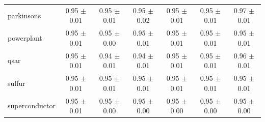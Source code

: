 \begin{table}[!htbp]
{\begin{tabular}{lcccccc}
parkinsons & 0.95 $\pm$ 0.01 & 0.95 $\pm$ 0.01 & 0.95 $\pm$ 0.02 & 0.95 $\pm$ 0.01 & 0.95 $\pm$ 0.01 & 0.97 $\pm$ 0.01 \\
powerplant & 0.95 $\pm$ 0.01 & 0.95 $\pm$ 0.00 & 0.95 $\pm$ 0.01 & 0.95 $\pm$ 0.01 & 0.95 $\pm$ 0.01 & 0.95 $\pm$ 0.01 \\
qsar & 0.95 $\pm$ 0.01 & 0.94 $\pm$ 0.01 & 0.94 $\pm$ 0.01 & 0.95 $\pm$ 0.01 & 0.95 $\pm$ 0.01 & 0.96 $\pm$ 0.01 \\
sulfur & 0.95 $\pm$ 0.01 & 0.95 $\pm$ 0.01 & 0.95 $\pm$ 0.01 & 0.95 $\pm$ 0.01 & 0.95 $\pm$ 0.01 & 0.95 $\pm$ 0.01 \\
superconductor & 0.95 $\pm$ 0.01 & 0.95 $\pm$ 0.00 & 0.95 $\pm$ 0.00 & 0.95 $\pm$ 0.00 & 0.95 $\pm$ 0.00 & 0.95 $\pm$ 0.00 \\
\bottomrule
\end{tabular}
}
\end{table}